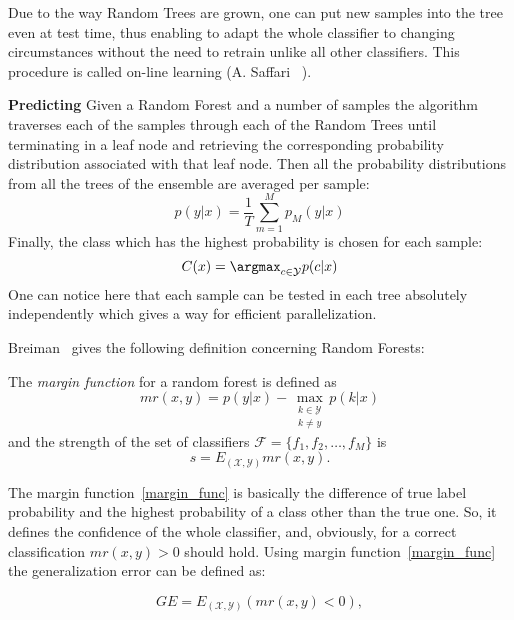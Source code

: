 Due to the way Random Trees are grown, one can put new samples into the tree
even at test time, thus enabling to adapt the whole classifier to changing
circumstances without the need to retrain unlike all other classifiers. This
procedure is called on-line learning (A. Saffari \etal~\cite{Saffari2009}).

{\bf Predicting} \quad Given a Random Forest and a number of
samples the algorithm traverses each of the samples through each of the Random
Trees until
terminating in a leaf node and retrieving the corresponding probability
distribution associated with that leaf node. Then all the probability
distributions from all the trees of the ensemble are averaged per sample:
\begin{equation}
 p(y|x) = \frac{1}{T}\sum_{m=1}^{M}p_M(y|x)
\end{equation}
Finally, the class which has the highest probability is chosen for each sample:
\begin{equation}
 C(x) = \argmax_{c \in \mathcal{Y}} p(c|x)
\end{equation}
One can notice here that each sample can be tested in each tree absolutely
independently which gives a way for efficient parallelization.

Breiman~\cite{Breiman2001} gives the following definition concerning Random Forests:
\begin{definition} 
 The \emph{margin function} for a random forest is defined as
 \begin{equation}
  mr(x, y) = p(y | x) - \max_{\substack{k \in \mathcal{Y} \\ k \neq y}}p(k | x) \label{margin_func}
 \end{equation}
 and the strength of the set of classifiers $ \mathcal{F} = \lbrace f_1, f_2,\dotsc, f_M \rbrace $ is 
 \begin{equation}
  s = E_{(\mathcal{X}, \mathcal{Y})}mr(x, y). \label{strength}
 \end{equation}
\end{definition}
The margin function~\eqref{margin_func} is basically the difference of true label probability and the highest probability of
a class other than the true one. So, it defines the confidence of the whole classifier, and, obviously, for a correct
classification $ mr(x, y) > 0 $ should hold. Using margin function~\eqref{margin_func} the generalization error can be defined as:

\begin{equation}
 GE = E_{(\mathcal{X}, \mathcal{Y})}(mr(x, y) < 0),
\end{equation}


